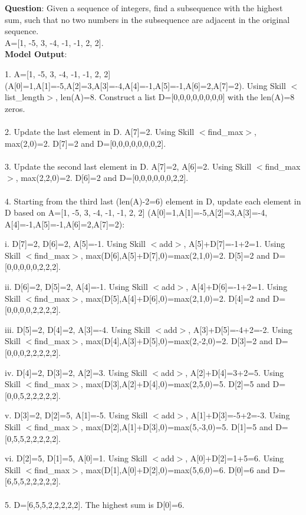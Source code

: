 \documentclass{article} %
\begin{document}
\begin{tcolorbox}[title = {DP}, colback = Apricot!25!white, colframe = BrickRed!75!black] 
\textbf{Question}:  Given a sequence of integers, find a subsequence with the highest sum, such that no two numbers in the subsequence are adjacent in the original sequence.  \\ 
A=[1, -5, 3, -4, -1, -1, 2, 2]. \\


\tcblower
\textbf{Model Output}:

\quad

1. A=[1, -5, 3, -4, -1, -1, 2, 2] (A[0]=1,A[1]=-5,A[2]=3,A[3]=-4,A[4]=-1,A[5]=-1,A[6]=2,A[7]=2). Using Skill $<$list\_length$>$, len(A)=8. Construct a list D=[0,0,0,0,0,0,0,0] with the len(A)=8 zeros. \\ \\
2. Update the last element in D. A[7]=2. Using Skill $<$find\_max$>$, max(2,0)=2. D[7]=2 and D=[0,0,0,0,0,0,0,2].  \\ \\
3. Update the second last element in D. A[7]=2, A[6]=2. Using Skill $<$find\_max$>$,  max(2,2,0)=2. D[6]=2 and D=[0,0,0,0,0,0,2,2]. \\ \\
4. Starting from the third last (len(A)-2=6) element in D, update each element in D based on A=[1, -5, 3, -4, -1, -1, 2, 2] (A[0]=1,A[1]=-5,A[2]=3,A[3]=-4, A[4]=-1,A[5]=-1,A[6]=2,A[7]=2): 

\quad

 \qquad i. D[7]=2, D[6]=2, A[5]=-1.  Using Skill $<$add$>$, A[5]+D[7]=-1+2=1. Using Skill $<$find\_max$>$, max(D[6],A[5]+D[7],0)=max(2,1,0)=2. D[5]=2 and  D=[0,0,0,0,0,2,2,2]. 
 
   \qquad  ii. D[6]=2, D[5]=2, A[4]=-1.  Using Skill $<$add$>$, A[4]+D[6]=-1+2=1.  Using Skill $<$find\_max$>$, max(D[5],A[4]+D[6],0)=max(2,1,0)=2. D[4]=2 and  D=[0,0,0,0,2,2,2,2]. 
   
   \qquad  iii. D[5]=2, D[4]=2, A[3]=-4.  Using Skill $<$add$>$, A[3]+D[5]=-4+2=-2. Using Skill $<$find\_max$>$, max(D[4],A[3]+D[5],0)=max(2,-2,0)=2. D[3]=2 and  D=[0,0,0,2,2,2,2,2]. 
   
   \qquad  iv. D[4]=2, D[3]=2, A[2]=3.  Using Skill $<$add$>$, A[2]+D[4]=3+2=5.  Using Skill $<$find\_max$>$, max(D[3],A[2]+D[4],0)=max(2,5,0)=5. D[2]=5 and  D=[0,0,5,2,2,2,2,2]. 
   
   \qquad  v. D[3]=2, D[2]=5, A[1]=-5.  Using Skill $<$add$>$, A[1]+D[3]=-5+2=-3.  Using Skill $<$find\_max$>$, max(D[2],A[1]+D[3],0)=max(5,-3,0)=5. D[1]=5 and  D=[0,5,5,2,2,2,2,2]. 
   
   \qquad  vi. D[2]=5, D[1]=5, A[0]=1.  Using Skill $<$add$>$, A[0]+D[2]=1+5=6.  Using Skill $<$find\_max$>$, max(D[1],A[0]+D[2],0)=max(5,6,0)=6. D[0]=6 and  D=[6,5,5,2,2,2,2,2]. \\ \\
5. D=[6,5,5,2,2,2,2,2]. The highest sum is D[0]=6. 
\end{tcolorbox}
\end{document}
